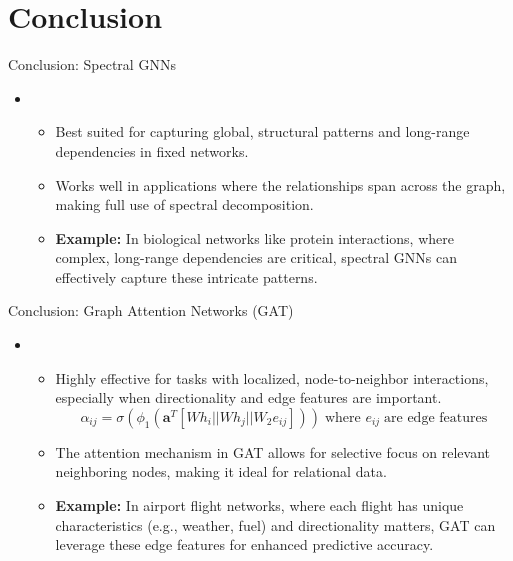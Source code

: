 \section{Conclusion}

\begin{frame}{Conclusion: Spectral GNNs}
    \begin{itemize}
        \item {}
        \begin{itemize}
            \item Best suited for capturing global, structural patterns and long-range dependencies in fixed networks.
            \item Works well in applications where the relationships span across the graph, making full use of spectral decomposition.
            \item \textbf{Example:} In biological networks like protein interactions, where complex, long-range dependencies are critical, spectral GNNs can effectively capture these intricate patterns.
        \end{itemize}
    \end{itemize}
\end{frame}

\begin{frame}{Conclusion: Graph Attention Networks (GAT)}
    \begin{itemize}
        \item {}
        \begin{itemize}
            \item Highly effective for tasks with localized, node-to-neighbor interactions, especially when directionality and edge features are important.
            $$ \alpha_{ij} = \sigma(\phi_1( \mathbf{a}^T [ W h_i || W h_j || W_2 e_{ij} ])) \; \text{where } e_{ij} \; \text{are edge features}$$
            \item The attention mechanism in GAT allows for selective focus on relevant neighboring nodes, making it ideal for relational data.
            \item \textbf{Example:} In airport flight networks, where each flight has unique characteristics (e.g., weather, fuel) and directionality matters, GAT can leverage these edge features for enhanced predictive accuracy.
        \end{itemize}
    \end{itemize}
\end{frame}

